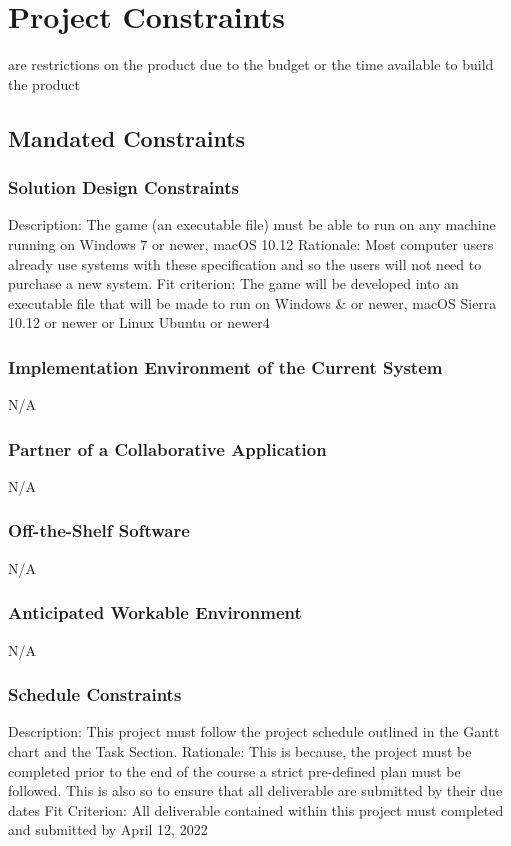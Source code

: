 \documentclass{article}
\begin{document}
\section{Project Constraints}
are restrictions on the product due to the budget or the 
time available to build the product
    \subsection{Mandated Constraints}
    \subsubsection{Solution Design Constraints}
    Description: The game (an executable file) must be able to run on any machine running on Windows 7 or newer, macOS 10.12 
    Rationale: Most computer users already use systems with these specification and so the users will not need to purchase a new system.
    Fit criterion: The game will be developed into an executable file that will be made to run on Windows & or newer, macOS Sierra 10.12 or newer or Linux Ubuntu or newer4
\subsubsection{Implementation Environment of the Current System}
N/A
\subsubsection{Partner of a Collaborative Application}
N/A
\subsubsection{Off-the-Shelf Software}
N/A
\subsubsection{Anticipated Workable Environment}
N/A
\subsubsection{Schedule Constraints}
Description: This project must follow the project schedule outlined in the Gantt chart and the Task Section.
Rationale: This is because, the project must be completed prior to the end of the course a strict pre-defined plan must be followed. This is also so to ensure that all deliverable are submitted by their due dates
Fit Criterion: All deliverable contained within this project must completed and submitted by April 12, 2022 
\end{document}
